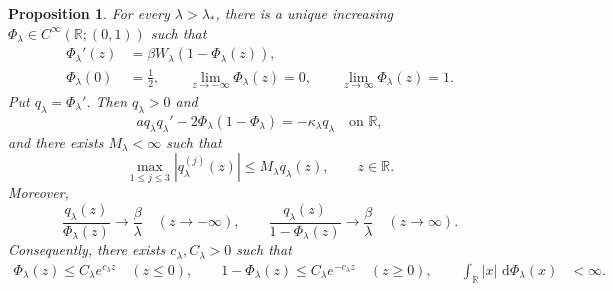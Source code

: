 \documentclass[a4paper,fleqn]{cas-sc}
\numberwithin{equation}{section}
\theoremstyle{plain}
\newtheorem{proposition}[theorem]{Proposition}
\theoremstyle{definition}
\newcommand{\dd}{\,\mathrm d}
\begin{document}
\begin{proposition}
\label{prop:full-line-distribution}
For every $\lambda>\lambda_*$, there is a unique increasing
$\Phi_\lambda\in C^\infty(\mathbb R;(0,1))$ such that
\begin{equation}
\begin{aligned}
 \Phi_\lambda'(z)&=\beta W_\lambda(1-\Phi_\lambda(z)),\\
 \Phi_\lambda(0)&=\frac12,\qquad
 \lim_{z\to-\infty}\Phi_\lambda(z)=0, \qquad
 \lim_{z\to\infty}\Phi_\lambda(z)=1.
\end{aligned}
 \label{eq:Phi-phase-definition}
\end{equation}
Put $q_\lambda=\Phi_\lambda'$.  Then $q_\lambda>0$ and
\begin{equation}
 a q_\lambda q_\lambda'
 -2\Phi_\lambda(1-\Phi_\lambda)
 =-\kappa_\lambda q_\lambda
 \quad\text{on }\mathbb R,
 \label{eq:upper-profile-equation}
\end{equation}
and there exists $M_\lambda<\infty$ such that
\begin{equation}
 \max_{1\le j\le3}|q_\lambda^{(j)}(z)|
 \le M_\lambda q_\lambda(z),
 \qquad z\in\mathbb R.
 \label{eq:full-line-relative-bounds}
\end{equation}
Moreover,
\begin{equation}
 \frac{q_\lambda(z)}{\Phi_\lambda(z)}\longrightarrow\frac\beta\lambda
 \quad(z\to-\infty),
 \qquad
 \frac{q_\lambda(z)}{1-\Phi_\lambda(z)}\longrightarrow\frac\beta\lambda
 \quad(z\to\infty).
 \label{eq:full-line-tail-ratios}
\end{equation}
Consequently, there exists $c_\lambda,C_\lambda>0$ such that
\[
\begin{aligned}
 \Phi_\lambda(z)\le C_\lambda e^{c_\lambda z}
 \quad(z\le0),\qquad
 1-\Phi_\lambda(z)\le C_\lambda e^{-c_\lambda z}
 \quad(z\ge0),\qquad
 \int_{\mathbb R}|x|\,\dd\Phi_\lambda(x)&<\infty.
\end{aligned}
\]
\end{proposition}
\end{document}
